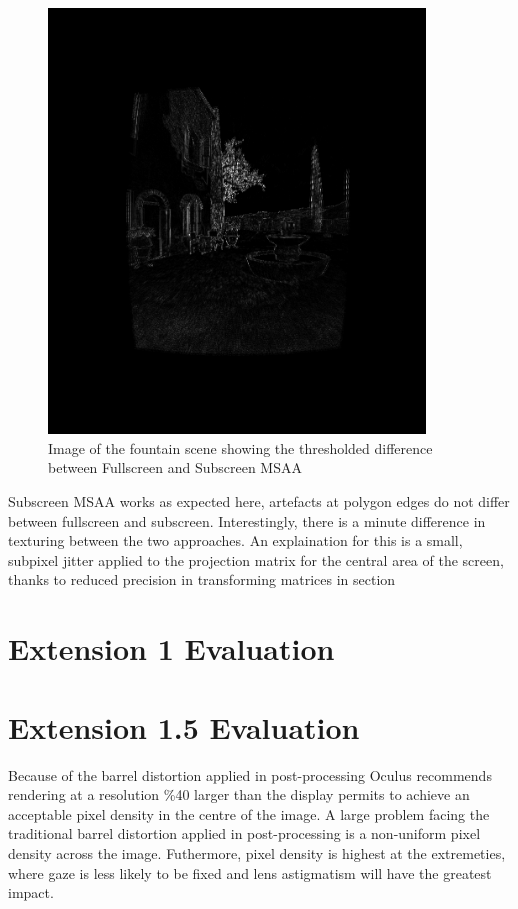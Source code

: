 \documentclass[12pt,a4paper,twoside,openright]{report}
\begin{document}
\begin{figure}[tbh]
\centerline{\includegraphics[width=10cm]{figs/fullscreenminussubscreenmsaa.png}}
\caption{Image of the fountain scene showing the thresholded difference between Fullscreen and Subscreen MSAA}
\label{ssaatree}
\end{figure}

Subscreen MSAA works as expected here, artefacts at polygon edges do not differ between fullscreen and subscreen. Interestingly, there is a minute difference in texturing between the two approaches. An explaination for this is a small, subpixel jitter applied to the projection matrix for the central area of the screen, thanks to reduced precision in transforming matrices in section

\section{Extension 1 Evaluation}



\section{Extension 1.5 Evaluation}

Because of the barrel distortion applied in post-processing Oculus recommends rendering at a resolution \%40 larger than the display permits to achieve an acceptable pixel density in the centre of the image.
A large problem facing the traditional barrel distortion applied in post-processing is a non-uniform pixel density across the image. Futhermore, pixel density is highest at the extremeties, where gaze is less likely to be fixed and lens astigmatism will have the greatest impact. 
\end{document}
